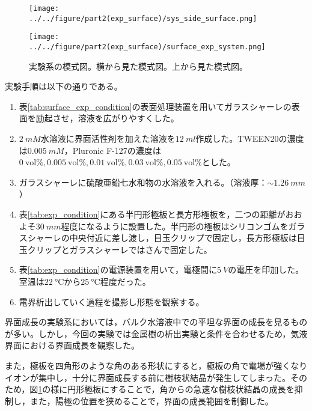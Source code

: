 \documentclass[autodetect-engine,dvi=dvipdfmx,a4paper,ja=standard,oneside,openany,11pt,draft]{bxjsbook}
\begin{document}
\begin{figure}[htbp]
  \begin{minipage}
    {0.55\textwidth}
    \subcaption{}
    \centering
    \texttt{[image: ../../figure/part2(exp\_surface)/sys\_side\_surface.png]}
    \label{fig:sys_side_surface}
  \end{minipage}
  \begin{minipage}{0.4\hsize}
    \subcaption{}
    \centering
    \texttt{[image: ../../figure/part2(exp\_surface)/surface\_exp\_system.png]}
    \label{fig:sys_top_surface}
  \end{minipage}
  \caption{実験系の模式図。横から見た模式図。上から見た模式図。}
  \label{fig:surface_exp_system}
\end{figure}

実験手順は以下の通りである。
\begin{enumerate}
  \item 表\ref{tab:surface_exp_condition}の表面処理装置を用いてガラスシャーレの表面を励起させ，溶液を広がりやすくした。
  \item  {} $\SI{2}{mM}$水溶液に界面活性剤を加えた溶液を$\SI{12}{ml}$作成した。TWEEN20の濃度は$\SI{0.005}{mM}$，Pluronic F-127の濃度は$\SI{0}{\mathrm{vol}\%}, \SI{0.005}{\mathrm{vol}\%}, \SI{0.01}{\mathrm{vol}\%}, \SI{0.03}{\mathrm{vol}\%}, \SI{0.05}{\mathrm{vol}\%}$とした。
  \item ガラスシャーレに硫酸亜鉛七水和物の水溶液を入れる。（溶液厚：$\sim\SI{1.26}{mm}$）
  \item 表\ref{tab:exp_condition}にある半円形極板と長方形極板を，二つの距離がおおよそ$\SI{30}{mm}$程度になるように設置した。半円形の極板はシリコンゴムをガラスシャーレの中央付近に差し渡し，目玉クリップで固定し，長方形極板は目玉クリップとガラスシャーレではさんで固定した。
  \item 表\ref{tab:exp_condition}の電源装置を用いて，電極間に$\SI{5}{V}$の電圧を印加した。室温は$\SI{22}{\degreeCelsius}$から$\SI{25}{\degreeCelsius}$程度だった。
  \item 電界析出していく過程を撮影し形態を観察する。
\end{enumerate}
界面成長の実験系においては，バルク水溶液中での平坦な界面の成長を見るものが多い\cite{schilardi1998evolution}。しかし，今回の実験では金属樹の析出実験と条件を合わせるため，気液界面における界面成長を観察した。

また，極板を四角形のような角のある形状にすると，極板の角で電場が強くなりイオンが集中し，十分に界面成長する前に樹枝状結晶が発生してしまった。そのため，図\ref{fig:surface_exp_system}の様に円形極板にすることで，角からの急速な樹枝状結晶の成長を抑制し，また，陽極の位置を狭めることで，界面の成長範囲を制御した。
\end{document}
